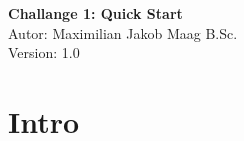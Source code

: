 \documentclass{article}
\begin{document}
    \begin{center}
        \Large \textbf{Challange 1: Quick Start} \\ [6pt]
        \normalsize
        Autor: Maximilian Jakob Maag B.Sc. \\
        Version: 1.0
    \end{center}
    \section{Intro}
\end{document}
